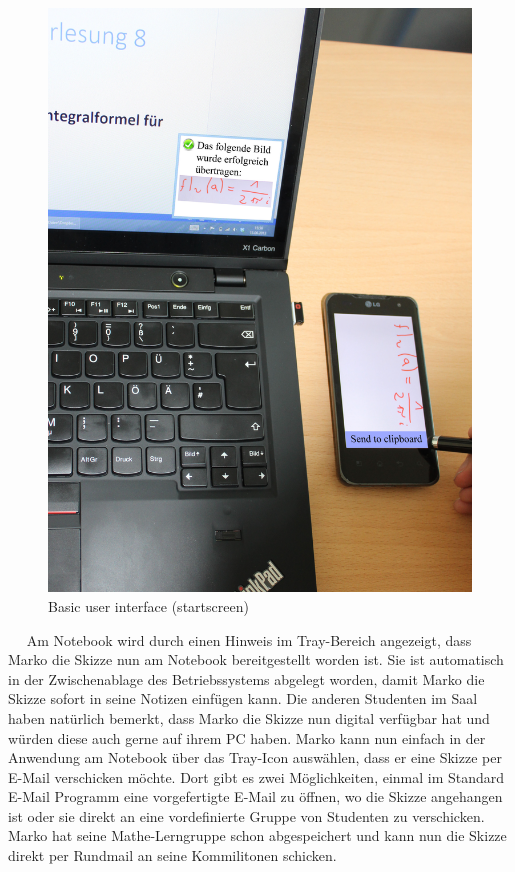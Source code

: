 \documentclass{chi-ext}
\begin{document}
\begin{figure}
  \centering
  \includegraphics[width=\linewidth]{img/szenario/szenario_3.jpg}
  \caption{Basic user interface (startscreen)}
  \label{fig:mockup_startscreen}
\end{figure}
 
Am Notebook wird durch einen Hinweis im Tray-Bereich angezeigt, dass Marko die Skizze nun am Notebook bereitgestellt worden ist. Sie ist automatisch in der Zwischenablage des Betriebssystems abgelegt worden, damit Marko die Skizze sofort in seine Notizen einfügen kann. 
Die anderen Studenten im Saal haben natürlich bemerkt, dass Marko die Skizze nun digital verfügbar hat und würden diese auch gerne auf ihrem PC haben. Marko kann nun einfach in der Anwendung am Notebook über das Tray-Icon auswählen, dass er eine Skizze per E-Mail verschicken möchte. Dort gibt es zwei Möglichkeiten, einmal im Standard E-Mail Programm eine vorgefertigte E-Mail zu öffnen, wo die Skizze angehangen ist oder sie direkt an eine vordefinierte Gruppe von Studenten zu verschicken. Marko hat seine Mathe-Lerngruppe schon abgespeichert und kann nun die Skizze direkt per Rundmail an seine Kommilitonen schicken.
\end{document}

